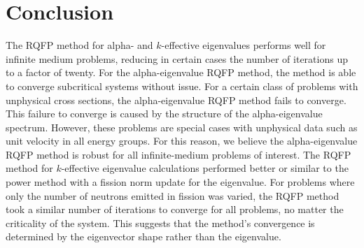 \label{sec:Res}

\section{Conclusion}

The RQFP method for alpha- and $k$-effective eigenvalues performs well for infinite medium problems, reducing in certain cases the number of iterations up to a factor of twenty. For the alpha-eigenvalue RQFP method, the method is able to converge subcritical systems without issue. For a certain class of problems with unphysical cross sections, the alpha-eigenvalue RQFP method fails to converge. This failure to converge is caused by the structure of the alpha-eigenvalue spectrum. However, these problems are special cases with unphysical data such as unit velocity in all energy groups. For this reason, we believe the alpha-eigenvalue RQFP method is robust for all infinite-medium problems of interest. The RQFP method for $k$-effective eigenvalue calculations performed better or similar to the power method with a fission norm update for the eigenvalue. For problems where only the number of neutrons emitted in fission was varied, the RQFP method took a similar number of iterations to converge for all problems, no matter the criticality of the system. This suggests that the method's convergence is determined by the eigenvector shape rather than the eigenvalue.

